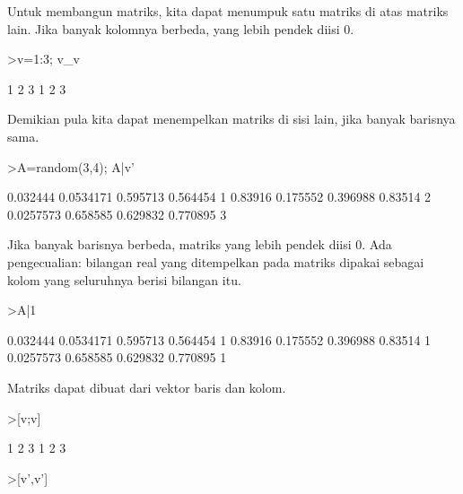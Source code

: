 \documentclass[a4paper,10pt]{article}
\begin{document}
\begin{eulernotebook}
\begin{eulercomment}
\begin{eulercomment}
\begin{eulercomment}
\begin{eulercomment}
\begin{eulercomment}
\begin{eulercomment}
\begin{eulercomment}
\begin{eulercomment}
\begin{eulercomment}
\begin{eulercomment}
\begin{eulercomment}
\begin{eulercomment}
\begin{eulercomment}
\begin{eulercomment}
\begin{eulercomment}
Untuk membangun matriks, kita dapat menumpuk satu matriks di atas matriks
lain. Jika banyak kolomnya berbeda, yang lebih pendek diisi 0.
\end{eulercomment}
\begin{eulerprompt}
>v=1:3; v_v
\end{eulerprompt}
\begin{euleroutput}
              1             2             3 
              1             2             3 
\end{euleroutput}
\begin{eulercomment}
Demikian pula kita dapat menempelkan matriks di sisi lain, jika banyak
barisnya sama.
\end{eulercomment}
\begin{eulerprompt}
>A=random(3,4); A|v'
\end{eulerprompt}
\begin{euleroutput}
       0.032444     0.0534171      0.595713      0.564454             1 
        0.83916      0.175552      0.396988       0.83514             2 
      0.0257573      0.658585      0.629832      0.770895             3 
\end{euleroutput}
\begin{eulercomment}
Jika banyak barisnya berbeda, matriks yang lebih pendek diisi 0. Ada
pengecualian: bilangan real yang ditempelkan pada matriks dipakai sebagai
kolom yang seluruhnya berisi bilangan itu.
\end{eulercomment}
\begin{eulerprompt}
>A|1
\end{eulerprompt}
\begin{euleroutput}
       0.032444     0.0534171      0.595713      0.564454             1 
        0.83916      0.175552      0.396988       0.83514             1 
      0.0257573      0.658585      0.629832      0.770895             1 
\end{euleroutput}
\begin{eulercomment}
Matriks dapat dibuat dari vektor baris dan kolom.
\end{eulercomment}
\begin{eulerprompt}
>[v;v]
\end{eulerprompt}
\begin{euleroutput}
              1             2             3 
              1             2             3 
\end{euleroutput}
\begin{eulerprompt}
>[v',v']
\end{eulerprompt}

\end{eulercomment}
\end{eulercomment}
\end{eulercomment}
\end{eulercomment}
\end{eulercomment}
\end{eulercomment}
\end{eulercomment}
\end{eulercomment}
\end{eulercomment}
\end{eulercomment}
\end{eulercomment}
\end{eulercomment}
\end{eulercomment}
\end{eulercomment}
\end{eulernotebook}
\end{document}
